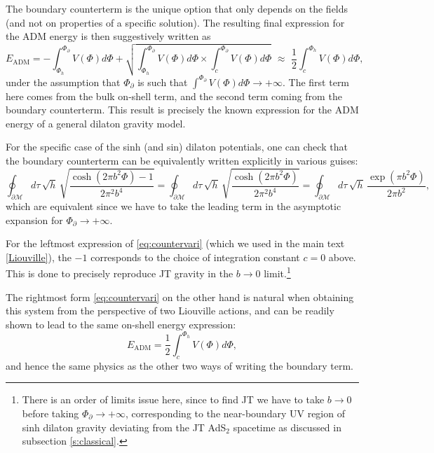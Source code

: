 \documentclass[a4paper,titlepage,12pt]{article}
\numberwithin{equation}{section}
\begin{document}
The boundary counterterm is the unique option that only depends on the fields (and not on properties of a specific solution).
The resulting final expression for the ADM energy is then suggestively written as
\begin{equation}
E_{\text{ADM}} = - \int^{\Phi_{\partial}}_{\Phi_h} V(\Phi) d\Phi + \sqrt{\int^{\Phi_{\partial}}_{\Phi_h} V(\Phi) d\Phi \times \int^{\Phi_{\partial}}_c V(\Phi) d\Phi} \,\, \approx \,\, \frac{1}{2}\int^{\Phi_h}_{c}V(\Phi)d\Phi,
\end{equation}
under the assumption that $\Phi_{\partial}$ is such that $\int^{\Phi_{\partial}} V(\Phi) d\Phi \to +\infty$.
The first term here comes from the bulk on-shell term, and the second term coming from the boundary counterterm. This result is precisely the known expression for the ADM energy of a general dilaton gravity model. 

For the specific case of the sinh (and sin) dilaton potentials, one can check that the boundary counterterm can be equivalently written explicitly in various guises:
\begin{equation}
\label{eq:countervari}
\oint_{\partial \mathcal{M}} d \tau\,\sqrt{h}\,\sqrt{\frac{\cosh(2\pi b^2 \Phi)-1}{2\pi^2 b^4}} =  \oint_{\partial \mathcal{M}} d \tau\,\sqrt{h}\,\sqrt{\frac{\cosh(2\pi b^2 \Phi)}{2\pi^2 b^4}} = \oint_{\partial \mathcal{M}} d \tau\,\sqrt{h}\,\frac{\exp(\pi b^2 \Phi)}{2\pi b^2},
\end{equation}
which are equivalent since we have to take the leading term in the asymptotic expansion for $\Phi_\partial \to +\infty$. 

For the leftmost expression of \eqref{eq:countervari} (which we used in the main text \eqref{Liouville}), the $-1$ corresponds to the choice of integration constant $c=0$ above. This is done to precisely reproduce JT gravity in the $b\to 0$ limit.\footnote{There is an order of limits issue here, since to find JT we have to take $b\to 0$ before taking $\Phi_\partial \to +\infty$, corresponding to the near-boundary UV region of sinh dilaton gravity deviating from the JT AdS$_2$ spacetime as discussed in subsection \ref{s:classical}.}

The rightmost form \eqref{eq:countervari} on the other hand is natural when obtaining this system from the perspective of two Liouville actions, and can be readily shown to lead to the same on-shell energy expression:
\begin{equation}\label{eq:ADM}
E_{\text{ADM}} = \frac{1}{2}\int^{\Phi_h}_{c}V(\Phi)d\Phi,
\end{equation}
and hence the same physics as the other two ways of writing the boundary term.
\end{document}
